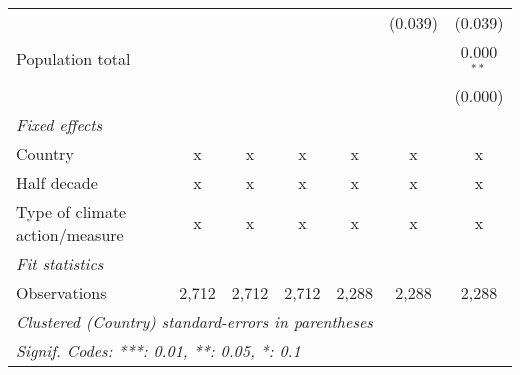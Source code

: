 \begin{tabular}{lcccccc}
                                                      &                &               &               &               & (0.039)       & (0.039)\\   
   Population total                                   &                &               &               &               &               & 0.000$^{**}$\\   
                                                      &                &               &               &               &               & (0.000)\\   
   \emph{Fixed effects}\\
   Country                                            & x              & x             & x             & x             & x             & x\\  
   Half decade                                        & x              & x             & x             & x             & x             & x\\  
   Type of climate action/measure                     & x              & x             & x             & x             & x             & x\\  
   \midrule \emph{Fit statistics}\\
   Observations                                       & 2,712          & 2,712         & 2,712         & 2,288         & 2,288         & 2,288\\  
   \midrule
   \multicolumn{7}{l}{\emph{Clustered (Country) standard-errors in parentheses}}\\
   \multicolumn{7}{l}{\emph{Signif. Codes: ***: 0.01, **: 0.05, *: 0.1}}\\
\end{tabular}
\par\endgroup


